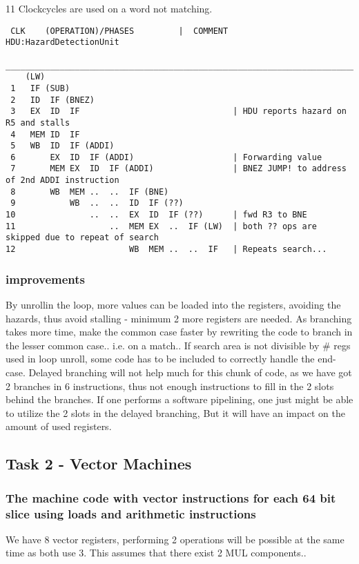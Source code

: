 \documentclass[a4paper,10pt]{article}
\begin{document}
11 Clockcycles are used on a word not matching.
\begin{verbatim}
 CLK    (OPERATION)/PHASES         |  COMMENT   HDU:HazardDetectionUnit
 ________________________________________________________________________________________________
    (LW)  
 1   IF (SUB)
 2   ID  IF (BNEZ) 
 3   EX  ID  IF                               | HDU reports hazard on R5 and stalls
 4   MEM ID  IF     
 5   WB  ID  IF (ADDI)                    
 6       EX  ID  IF (ADDI)                    | Forwarding value
 7       MEM EX  ID  IF (ADDI)                | BNEZ JUMP! to address of 2nd ADDI instruction
 8       WB  MEM ..  ..  IF (BNE)
 9           WB  ..  ..  ID  IF (??)      
10               ..  ..  EX  ID  IF (??)      | fwd R3 to BNE
11                   ..  MEM EX  ..  IF (LW)  | both ?? ops are skipped due to repeat of search
12                       WB  MEM ..  ..  IF   | Repeats search...
\end{verbatim}

\subsubsection{improvements}
By unrollin the loop, more values can be loaded into the registers, avoiding the hazards, thus avoid stalling - minimum 2 more registers are needed.
As branching takes more time, make the common case faster by rewriting the code to branch in the lesser common case.. i.e. on a match..
If search area is not divisible by \# regs used in loop unroll, some code has to be included to correctly handle the end-case.
Delayed branching will not help much for this chunk of code, as we have got 2 branches in 6 instructions, thus not enough instructions to fill in the 2 slots behind the branches.
If one performs a software pipelining, one just might be able to utilize the 2 slots in the delayed branching, But it will have an impact on the amount of used registers.


\newpage
\subsection{Task 2 - Vector Machines}
\subsubsection{The machine code with vector instructions for each 64 bit slice using loads and arithmetic instructions}
We have 8 vector registers, performing 2 operations will be possible at the same time as both use 3.
This assumes that there exist 2 MUL components..
\end{document}
